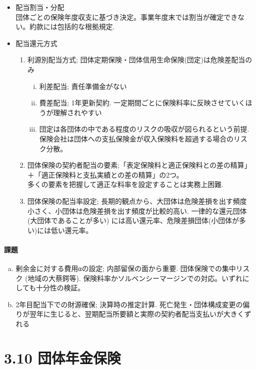 \documentclass[report,gutter=10mm,fore-edge=10mm,uplatex,dvipdfmx]{jlreq}
\begin{document}
\begin{itemize}
 \item 配当割当・分配\\
団体ごとの保険年度収支に基づき決定。事業年度末では割当が確定できない。約款には包括的な根拠規定. 
 \item 配当還元方式
\begin{enumerate}[(1)]
 \item 利源別配当方式; 団体定期保険・団体信用生命保険(団定)は危険差配当のみ
\begin{enumerate}[(i)]
 \item 利差配当; 責任準備金がない
 \item 費差配当; 1年更新契約. 一定期間ごとに保険料率に反映させていくほうが理解されやすい
 \item 団定は各団体の中である程度のリスクの吸収が図られるという前提. 保険会社は団体への支払保険金が収入保険料を超過する場合のリスク分散。
\end{enumerate}
 \item 団体保険の契約者配当の要素;「表定保険料と適正保険料との差の精算」＋「適正保険料と支払実績との差の精算」の2つ。\\
多くの要素を把握して適正な料率を設定することは実務上困難. 
 \item 団体保険の配当率設定; 長期的観点から、大団体は危険差損を出す頻度小さく、小団体は危険差損を出す頻度が比較的高い. 一律的な還元団体(大団体であることが多い) には高い還元率、危険差損団体(小団体が多い)には低い還元率。
\end{enumerate}
\end{itemize}

\paragraph{課題}

\begin{enumerate} [(a)]
 \item 剰余金に対する費用αの設定; 内部留保の面から重要. 団体保険での集中リスク (地域の大蔡鍔等). 保険料率かソルベンシーマージンでの対応。いずれにしても十分性の検証。
 \item 2年目配当下での財源確保; 決算時の推定計算. 死亡発生・団体構成変更の偏りが翌年に生じると、翌期配当所要額と実際の契約者配当支払いが大きくずれる
\end{enumerate}


\section{3.10 団体年金保険}
\end{document}
